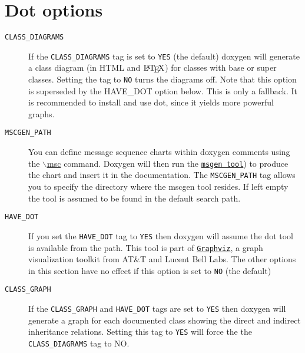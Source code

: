 \hypertarget{config_config_dot}{}\section{Dot options}\label{config_config_dot}
\label{config_cfg_class_diagrams}
\hypertarget{config_cfg_class_diagrams}{}
 \begin{description}
\item[{\tt CLASS\_\-DIAGRAMS} ] If the {\tt CLASS\_\-DIAGRAMS} tag is set to {\tt YES} (the default) doxygen will generate a class diagram (in HTML and $\mbox{\LaTeX}$) for classes with base or super classes. Setting the tag to {\tt NO} turns the diagrams off. Note that this option is superseded by the HAVE\_\-DOT option below. This is only a fallback. It is recommended to install and use dot, since it yields more powerful graphs.

\label{config_cfg_mscgen_path}
\hypertarget{config_cfg_mscgen_path}{}
 \item[{\tt MSCGEN\_\-PATH} ] You can define message sequence charts within doxygen comments using the \hyperlink{commands_cmdmsc}{$\backslash$msc} command. Doxygen will then run the \href{http://www.mcternan.me.uk/mscgen/}{\tt msgen tool}) to produce the chart and insert it in the documentation. The {\tt MSCGEN\_\-PATH} tag allows you to specify the directory where the mscgen tool resides. If left empty the tool is assumed to be found in the default search path.

\label{config_cfg_have_dot}
\hypertarget{config_cfg_have_dot}{}
 \item[{\tt HAVE\_\-DOT} ] If you set the {\tt HAVE\_\-DOT} tag to {\tt YES} then doxygen will assume the dot tool is available from the path. This tool is part of \href{http://www.research.att.com/sw/tools/graphviz/}{\tt Graphviz}, a graph visualization toolkit from AT\&T and Lucent Bell Labs. The other options in this section have no effect if this option is set to {\tt NO} (the default)

\label{config_cfg_class_graph}
\hypertarget{config_cfg_class_graph}{}
 \item[{\tt CLASS\_\-GRAPH} ] If the {\tt CLASS\_\-GRAPH} and {\tt HAVE\_\-DOT} tags are set to {\tt YES} then doxygen will generate a graph for each documented class showing the direct and indirect inheritance relations. Setting this tag to {\tt YES} will force the the {\tt CLASS\_\-DIAGRAMS} tag to NO.


\end{description}

